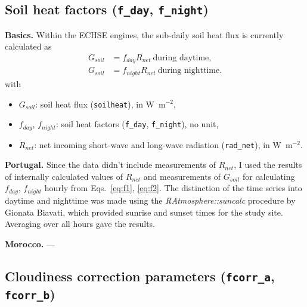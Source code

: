 \documentclass{scrreprt}
\newenvironment{denseitem}{
  \begin{itemize}
    \setlength{\itemsep}{0pt}
    \setlength{\parskip}{0pt}
    \setlength{\parsep}{0pt}
}{
  \end{itemize}
}
\begin{document}
\newpage
\subsection{Soil heat factors (\texttt{f\_day}, \texttt{f\_night})} \label{ssec:parest_rad_f}

\textbf{Basics.}
Within the ECHSE engines, the sub-daily soil heat flux is currently calculated as
\begin{align}
  G_{soil} &= f_{day} R_{net} ~ \text{during daytime}, \label{eq:f1} \\
  G_{soil} &= f_{night} R_{net} ~ \text{during nighttime}. \label{eq:f2}
\end{align}
%
with
\begin{denseitem}
  \item[] $G_{soil}$: soil heat flux (\verb!soilheat!), in W~m$^{-2}$,
  \item[] $f_{day}$, $f_{night}$: soil heat factors (\verb!f_day!, \verb!f_night!), no unit,
  \item[] $R_{net}$: net incoming short-wave and long-wave radiation (\verb!rad_net!), in W~m$^{-2}$.
\end{denseitem}

\noindent
\textbf{Portugal.}
Since the data didn't include measurements of $R_{net}$, I used the results of internally calculated values of $R_{net}$ and measurements of $G_{soil}$ for calculating $f_{day}$, $f_{night}$ hourly from Eqs.~\eqref{eq:f1}, \eqref{eq:f2}.
The distinction of the time series into daytime and nighttime was made using the \emph{RAtmosphere::suncalc} procedure by Gionata Biavati, which provided sunrise and sunset times for the study site.
Averaging over all hours gave the results.

\noindent
\textbf{Morocco.}
---

\newpage
\subsection{Cloudiness correction parameters (\texttt{fcorr\_a}, \texttt{fcorr\_b})} \label{ssec:parest_rad_fcorr}
\end{document}
